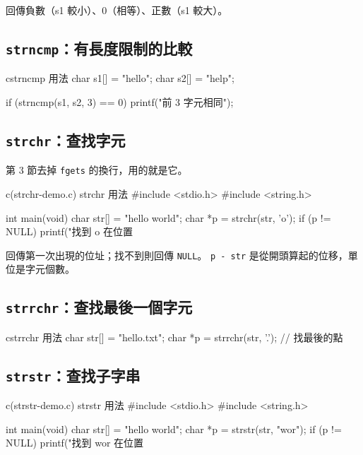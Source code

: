 
回傳負數（s1 較小）、$0$（相等）、正數（s1 較大）。

\subsection{\texttt{strncmp}：有長度限制的比較}

\begin{code}{c}{strncmp 用法}
char s1[] = "hello";
char s2[] = "help";

if (strncmp(s1, s2, 3) == 0) {
    printf("前 3 字元相同\n");
}
\end{code}

\subsection{\texttt{strchr}：查找字元}

第 3 節去掉 \texttt{fgets} 的換行，用的就是它。

\begin{example}{c}{(strchr-demo.c) strchr 用法}
#include <stdio.h>
#include <string.h>

int main(void) {
    char str[] = "hello world";
    char *p = strchr(str, 'o');
    if (p != NULL) {
        printf("找到 o 在位置 %
    }
}
\end{example}


回傳第一次出現的位址；找不到則回傳 \texttt{NULL}。
\texttt{p - str} 是從開頭算起的位移，單位是字元個數。

\subsection{\texttt{strrchr}：查找最後一個字元}

\begin{code}{c}{strrchr 用法}
char str[] = "hello.txt";
char *p = strrchr(str, '.');  // 找最後的點
\end{code}

\subsection{\texttt{strstr}：查找子字串}

\begin{example}{c}{(strstr-demo.c) strstr 用法}
#include <stdio.h>
#include <string.h>

int main(void) {
    char str[] = "hello world";
    char *p = strstr(str, "wor");
    if (p != NULL) {
        printf("找到 wor 在位置 %
    }
}
\end{example}

